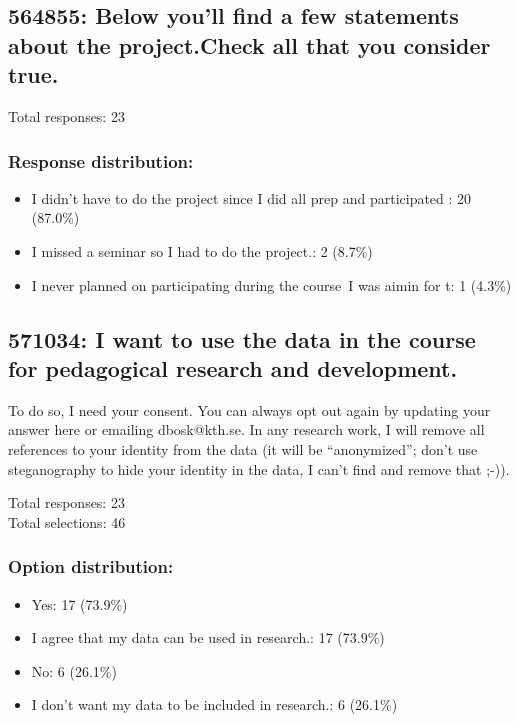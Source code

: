 \documentclass[a4paper]{report}
\begin{document}
\subsection{564855: Below you'll find a few statements about the project.Check 
all that you consider true.}

Total responses: 23\\

\subsubsection{Response distribution:}
\begin{itemize}
  \item I didn't have to do the project since I did all prep and participated : 20 (87.0\%)
  \item I missed a seminar so I had to do the project.: 2 (8.7\%)
  \item I never planned on participating during the course\, I was aimin for t: 1 (4.3\%)
\end{itemize}

\subsection{571034: I want to use the data in the course for pedagogical 
research and development.}

To do so, I need your consent. You can always opt out again by updating your 
answer here or emailing dbosk@kth.se.
In any research work, I will remove all references to your identity from the 
data (it will be \enquote{anonymized}; don't use steganography to hide your 
identity in the data, I can't find and remove that ;-)).

Total responses: 23\\
Total selections: 46\\

\subsubsection{Option distribution:}
\begin{itemize}
  \item Yes: 17 (73.9\%)
  \item I agree that my data can be used in research.: 17 (73.9\%)
  \item No: 6 (26.1\%)
  \item I don't want my data to be included in research.: 6 (26.1\%)
\end{itemize}
\end{document}
